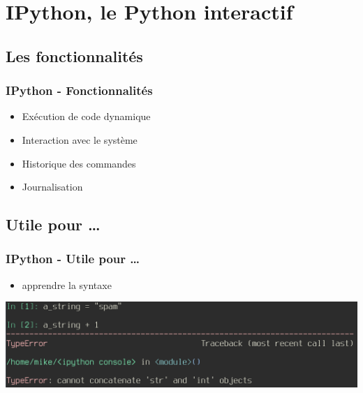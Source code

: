 \section{IPython, le Python interactif}
\subsection{Les fonctionnalités}

\begin{frame}
  \frametitle{IPython - Fonctionnalités}
  \begin{itemize}
    \item Exécution de code dynamique
    \item Interaction avec le système
    \item Historique des commandes
    \item Journalisation
  \end{itemize}
\end{frame}

\subsection{Utile pour \ldots}
\begin{frame}[fragile]
  \frametitle{IPython - Utile pour \ldots}
    \begin{itemize}
      \item apprendre la syntaxe
    \end{itemize}
  \includegraphics[scale=0.35]{apprendre.png}

\end{frame}

